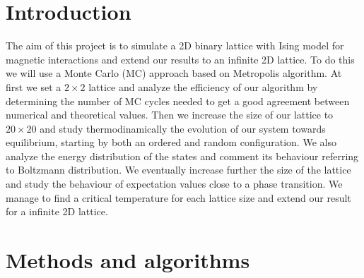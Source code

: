 \documentclass[%
 reprint,
 amsmath,amssymb,
 aps,
]{revtex4-1}
\theoremstyle{plain}
\theoremstyle{definition}
\theoremstyle{plain}
\begin{document}
\maketitle

\section{Introduction}
The aim of this project is to simulate a 2D binary lattice with Ising model for magnetic interactions and extend our results to an infinite 2D lattice. To do this we will use a Monte Carlo (MC) approach based on Metropolis algorithm.
At first we set a $2\times2$ lattice and analyze the efficiency of our algorithm by determining the number of MC cycles needed to get a good agreement between numerical and theoretical values. Then we increase the size of our lattice to $20\times20$ and study thermodinamically the evolution of our system towards equilibrium, starting by both an ordered and random configuration. We also analyze the energy distribution of the states and comment its behaviour referring to Boltzmann distribution. 
We eventually increase further the size of the lattice and study the behaviour of expectation values close to a phase transition. We manage to find a critical temperature for each lattice size and extend our result for a infinite 2D lattice.


\section{Methods and algorithms}
\end{document}
